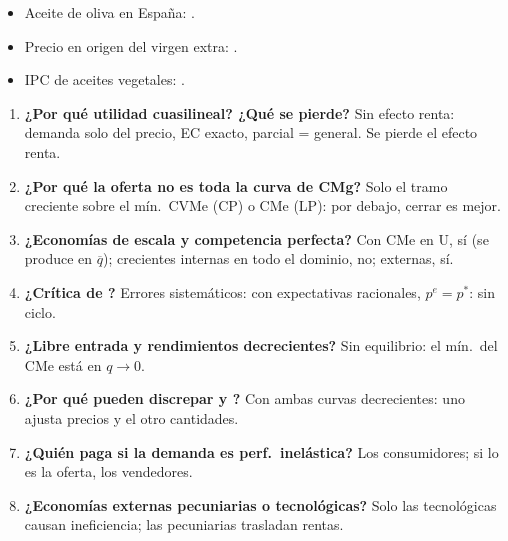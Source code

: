 \documentclass{article}
\begin{document}
\begin{columnas}
\anexorepaso
{}
\begin{itemize}
\item Aceite de oliva en España: .
\item Precio en origen del virgen extra: .
\item IPC de aceites vegetales: .
\end{itemize}
\begin{enumerate}
\item \textbf{¿Por qué utilidad cuasilineal? ¿Qué se pierde?} Sin efecto renta: demanda solo del precio, EC exacto, parcial = general. Se pierde el efecto renta.
\item \textbf{¿Por qué la oferta no es toda la curva de CMg?} Solo el tramo creciente sobre el mín.\ CVMe (CP) o CMe (LP): por debajo, cerrar es mejor.
\item \textbf{¿Economías de escala y competencia perfecta?} Con CMe en U, sí (se produce en $\overline{q}$); crecientes internas en todo el dominio, no; externas, sí.
\item \textbf{¿Crítica de ?} Errores sistemáticos: con expectativas racionales, $p^e=p^*$: sin ciclo.
\item \textbf{¿Libre entrada y rendimientos decrecientes?} Sin equilibrio: el mín.\ del CMe está en $q\to0$.
\item \textbf{¿Por qué pueden discrepar  y ?} Con ambas curvas decrecientes: uno ajusta precios y el otro cantidades.
\item \textbf{¿Quién paga si la demanda es perf.\ inelástica?} Los consumidores; si lo es la oferta, los vendedores.
\item \textbf{¿Economías externas pecuniarias o tecnológicas?} Solo las tecnológicas causan ineficiencia; las pecuniarias trasladan rentas.

\end{enumerate}
\end{columnas}
\end{document}
